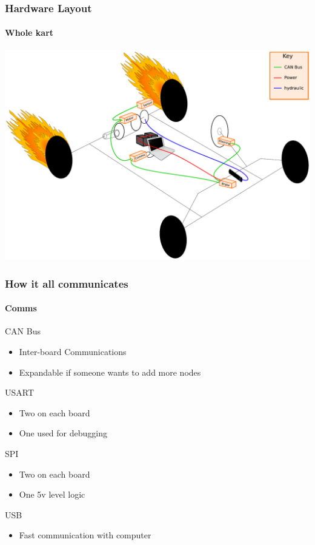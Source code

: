 \documentclass{beamer}
\begin{document}
\begin{frame}
\frametitle{Hardware Layout}
\framesubtitle{Whole kart}
    \begin{center}
      \includegraphics[width=.95\textwidth]{Images/layout}
    \end{center}
\end{frame}

\begin{frame}
\frametitle{How it all communicates}
\framesubtitle{Comms}
CAN Bus
\begin{itemize}
\item Inter-board Communications
\item Expandable if someone wants to add more nodes
\end{itemize}
USART
\begin{itemize}
\item Two on each board
\item One used for debugging
\end{itemize}
SPI
\begin{itemize}
\item Two on each board
\item One 5v level logic
\end{itemize}
USB
\begin{itemize}
\item Fast communication with computer
\end{itemize}
\end{frame}
\end{document}
